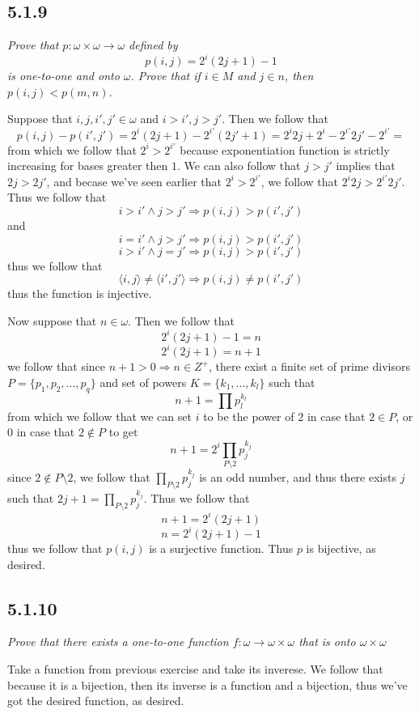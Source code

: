 \documentclass[11pt,oneside,titlepage]{book}
\DeclareMathOperator \ra {\Rightarrow}
\newcommand{\eangle}[1]{\langle #1 \rangle}
\begin{document}
\subsection*{5.1.9}

\textit{Prove that $p: \omega \times \omega \to \omega$ defined by
  $$p(i, j) = 2^i(2j + 1) - 1$$
  is one-to-one and onto $\omega$. Prove that if $i \in M$ and $j \in n$,
  then $p(i, j) < p(m, n)$.}

Suppose that $i, j, i', j' \in \omega$ and $i > i', j > j'$. Then we follow that
$$p(i, j) - p(i', j') = 2^i(2j + 1) - 2^{i'}(2j' + 1) =
2^i 2j + 2^i - 2^{i'} 2j' - 2^{i'} = $$
from which we follow that $2^i > 2^{i'}$ because exponentiation function is strictly increasing
for bases greater then $1$.
We can also follow that $j > j'$ implies that $2j > 2j'$, and becase we've seen earlier that
$2^i > 2^{i'}$, we follow that $2^i 2j  > 2^{i'} 2j'$. Thus we follow that
$$i > i' \land j > j' \ra p(i, j) > p(i', j')$$
and
$$i = i' \land j > j' \ra p(i, j) > p(i', j')$$
$$i > i' \land j = j' \ra p(i, j) > p(i', j')$$
thus we follow that
$$\eangle{i, j} \neq \eangle{i', j'} \ra p(i, j) \neq p(i', j')$$
thus the function is injective.

Now suppose that $n \in \omega$. Then we follow that
$$2^i(2j + 1) - 1 = n$$
$$2^i(2j + 1)  = n + 1$$
we follow that since $n  + 1 > 0 \ra n \in Z^+$,
there exist a finite set of prime divisors $P = \{p_1, p_2, ..., p_q\}$ and set of powers
$K = \{k_1, ..., k_l\}$ such that
$$n + 1 = \prod{p_l^{k_l}}$$
from which we follow that we can set $i$ to be the power of $2$ in case that $2 \in P$, or
$0$ in case that $2 \notin P$ to get 
$$n + 1 = 2^i\prod_{P \setminus 2}{p_j^{k_j}}$$
since $2 \notin P \setminus 2$, we follow that $\prod_{P \setminus 2}{p_j^{k_j}}$ is an odd
number, and thus there exists $j$ such that $2j + 1 = \prod_{P \setminus 2}{p_j^{k_j}}$. Thus
we follow that
$$n + 1 = 2^i(2j + 1)$$
$$n = 2^i(2j + 1) - 1$$
thus we follow that $p(i, j)$ is a surjective function. Thus $p$ is bijective, as desired.

\subsection*{5.1.10}

\textit{Prove that there exists a one-to-one function $f: \omega \to \omega \times \omega$
  that is onto $\omega \times \omega$}

Take a function from previous exercise and take its inverese. We follow that because it is a
bijection, then its inverse is a function and a bijection, thus we've got the desired
function, as desired.
\end{document}
